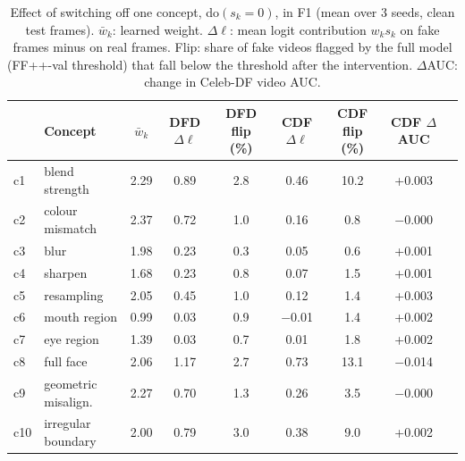 \begin{table}[t]
\centering
\footnotesize
\setlength{\tabcolsep}{4pt}
\caption{Effect of switching off one concept, do$(s_k{=}0)$, in F1 (mean over 3 seeds, clean test frames). $\bar w_k$: learned weight. $\Delta\ell$: mean logit contribution $w_k s_k$ on fake frames minus on real frames. Flip: share of fake videos flagged by the full model (FF++-val threshold) that fall below the threshold after the intervention. $\Delta$AUC: change in Celeb-DF video AUC.}
\label{tab:effects}
\begin{tabular}{llccccccc}
\toprule
& Concept & $\bar w_k$ & DFD $\Delta\ell$ & DFD flip (\%) & CDF $\Delta\ell$ & CDF flip (\%) & CDF $\Delta$AUC \\
\midrule
c1 & blend strength & 2.29 & 0.89 & 2.8 & 0.46 & 10.2 & +0.003 \\
c2 & colour mismatch & 2.37 & 0.72 & 1.0 & 0.16 & 0.8 & $-$0.000 \\
c3 & blur & 1.98 & 0.23 & 0.3 & 0.05 & 0.6 & +0.001 \\
c4 & sharpen & 1.68 & 0.23 & 0.8 & 0.07 & 1.5 & +0.001 \\
c5 & resampling & 2.05 & 0.45 & 1.0 & 0.12 & 1.4 & +0.003 \\
c6 & mouth region & 0.99 & 0.03 & 0.9 & $-$0.01 & 1.4 & +0.002 \\
c7 & eye region & 1.39 & 0.03 & 0.7 & 0.01 & 1.8 & +0.002 \\
c8 & full face & 2.06 & 1.17 & 2.7 & 0.73 & 13.1 & $-$0.014 \\
c9 & geometric misalign. & 2.27 & 0.70 & 1.3 & 0.26 & 3.5 & $-$0.000 \\
c10 & irregular boundary & 2.00 & 0.79 & 3.0 & 0.38 & 9.0 & +0.002 \\
\bottomrule
\end{tabular}
\end{table}
